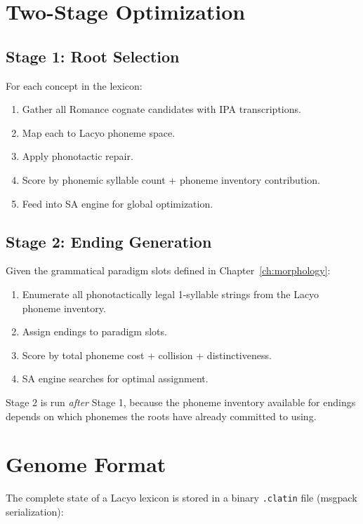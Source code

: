 \documentclass[12pt]{book}
\begin{document}
\section{Two-Stage Optimization}

\subsection{Stage 1: Root Selection}

For each concept in the lexicon:
\begin{enumerate}
  \item Gather all Romance cognate candidates with IPA transcriptions.
  \item Map each to Lacyo phoneme space.
  \item Apply phonotactic repair.
  \item Score by phonemic syllable count + phoneme inventory contribution.
  \item Feed into SA engine for global optimization.
\end{enumerate}

\subsection{Stage 2: Ending Generation}

Given the grammatical paradigm slots defined in Chapter~\ref{ch:morphology}:
\begin{enumerate}
  \item Enumerate all phonotactically legal 1-syllable strings from the
        Lacyo phoneme inventory.
  \item Assign endings to paradigm slots.
  \item Score by total phoneme cost + collision + distinctiveness.
  \item SA engine searches for optimal assignment.
\end{enumerate}

Stage 2 is run \emph{after} Stage 1, because the phoneme inventory
available for endings depends on which phonemes the roots have already
committed to using.

\section{Genome Format}

The complete state of a Lacyo lexicon is stored in a binary \texttt{.clatin}
file (msgpack serialization):
\end{document}
